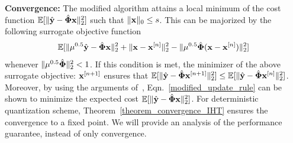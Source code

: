 \documentclass[aoas,preprint]{imsart}
\numberwithin{equation}{section}
\theoremstyle{plain}
\begin{document}


\vspace{0.5em}

{\bf Convergence:} The modified algorithm attains a local minimum of the cost function $\mathbb{E} [ \| \hat{\bf y} - \hat{\bf \Phi}{\bf x}\|_2^2]$ such that $\|{\bf x}\|_0 \leq s$. This can be majorized by the following surrogate objective function 
\begin{equation*}
    \begin{split}
        \mathbb{E} [\|\mu^{0.5}\hat{\bf y} -   \hat{\bf \Phi}{\bf x}\|_2^2+ \|{\bf x} 
    - {\bf x}^{[n]} \|_2^2
    - \|\mu^{0.5}\hat{\bf \Phi}({\bf x}- {\bf x}^{[n]}) \|_2^2] 
    \end{split}
\end{equation*}
whenever $\| \mu^{0.5}\hat{\bf \Phi}\|_2^2 <1$. If this condition is met, the minimizer of the above surrogate objective: ${\bf x}^{[n+1]}$ ensures that $\mathbb{E} [\| \hat{\bf y} - \hat{\bf \Phi}{\bf x}^{[n+1]}\|_2^2] \leq \mathbb{E}[ \| \hat{\bf y} - \hat{\bf \Phi}{\bf x}^{[n]}\|_2^2]$. Moreover, by using the arguments of~\cite{blumensath2008iht}, Eqn.~\ref{modified_update_rule} can be shown to minimize the expected cost $\mathbb{E} [ \| \hat{\bf y} - \hat{\bf \Phi}{\bf x}\|_2^2]$. For deterministic quantization scheme, Theorem~\ref{theorem_convergence_IHT} ensures the convergence to a fixed point. {We
will provide an analysis of the performance guarantee,
instead of only convergence.}
\vspace{0.5em}
\end{document}
